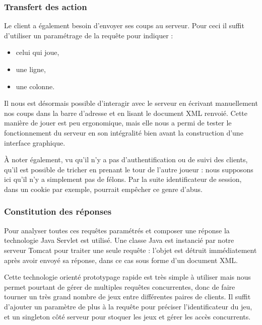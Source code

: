 \subsubsection{Transfert des action}
Le client a également besoin d'envoyer ses coups au serveur. Pour ceci il suffit d'utiliser un paramétrage de la requête pour indiquer :
\begin{itemize}
\item celui qui joue,
\item une ligne,
\item une colonne.
\end{itemize}
Il nous est désormais possible d'interagir avec le serveur en écrivant manuellement nos coups dans la barre d'adresse et en lisant le document XML renvoié. Cette manière de jouer est peu ergonomique, mais elle nous a permi de tester le fonctionnement du serveur en son intégralité bien avant la construction d'une interface graphique.

À noter également, vu qu'il n'y a pas d'authentification ou de suivi des clients, qu'il est possible de \og tricher \fg{} en prenant le tour de l'autre joueur  : nous supposons ici qu'il n'y a simplement pas de félons. Par la suite identificateur de session, dans un cookie par exemple, pourrait empêcher ce genre d'abus. 
\subsubsection{Constitution des réponses}
Pour analyser toutes ces requêtes paramétrés et composer une réponse la technologie \og Java Servlet \fg {} est utilisé. Une classe Java est instancié par notre serveur Tomcat pour traiter une seule requête : l'objet est détruit immédiatement après avoir envoyé sa réponse, dans ce cas sous forme d'un document XML.

Cette technologie orienté prototypage rapide est très simple à utiliser mais nous permet pourtant de gérer de multiples requêtes concurrentes, donc de faire tourner un très grand nombre de jeux entre différentes paires de clients. Il suffit d'ajouter un paramètre de plus à la requête pour préciser l'identificateur du jeu, et un singleton côté serveur pour stoquer les jeux et gérer les accès concurrents.
